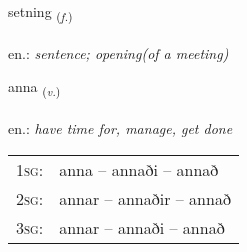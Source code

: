 \documentclass[frontgrid, backgrid]{flacards}\usepackage[]{graphicx}\usepackage[]{xcolor}
\begin{document}
\renewcommand{\flhead}{\vskip5pt \fboxsep=0pt {\small\bfseries\footnotesize Nafnorð | Noun}}
\renewcommand{\fcfoot}{\vskip5pt \fboxsep=0pt \hspace{2pt}{\small\bfseries\footnotesize 2K}}

\renewcommand{\blhead}{\vskip5pt {\small\bfseries\footnotesize Nafnorð | Noun }}
\renewcommand{\bcfoot}{\vskip5pt \hspace{2pt}{\small\bfseries\footnotesize 2K}}


{setning \small{\textsubscript{(\textit{f.})}} \\[1ex] %
\textphonetic{[sɛhtniŋk]} \\
en.: \emph{sentence; opening(of a meeting)} \\  [2ex]
\renewcommand*{\arraystretch}{0.8}
}

\renewcommand{\flhead}{\vskip5pt \fboxsep=0pt {\small\bfseries\footnotesize Sagnorð | Verb}}
\renewcommand{\fcfoot}{\vskip5pt \fboxsep=0pt \hspace{2pt}{\small\bfseries\footnotesize 2K}}

\renewcommand{\blhead}{\vskip5pt {\small\bfseries\footnotesize Sagnorð | Verb }}
\renewcommand{\bcfoot}{\vskip5pt \hspace{2pt}{\small\bfseries\footnotesize 2K}}


{anna \small{\textsubscript{(\textit{v.})}} \\[1ex] %
\textphonetic{[ana]} \\
en.: \emph{have time for, manage, get done} \\  [2ex]
\renewcommand*{\arraystretch}{0.8}
\begin{tabular}{p{1cm}l}
\textsc{1sg}: & anna -- annaði -- annað \\ 
\textsc{2sg}: & annar -- annaðir -- annað \\ 
\textsc{3sg}: & annar -- annaði -- annað \\ 
\end{tabular}
}
\end{document}
